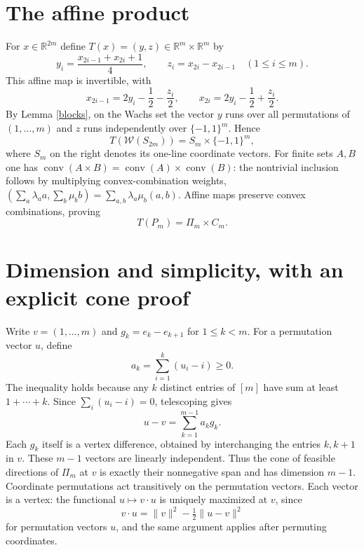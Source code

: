 \documentclass[11pt]{article}
\newcommand{\conv}{\operatorname{conv}}
\newcommand{\W}{\mathcal W}
\begin{document}
\section*{The affine product}
For $x\in\mathbb R^{2m}$ define $T(x)=(y,z)\in\mathbb R^m\times\mathbb R^m$
by
\begin{equation}\label{map}
 y_i=\frac{x_{2i-1}+x_{2i}+1}{4},\qquad
 z_i=x_{2i}-x_{2i-1}\quad(1\leq i\leq m).
\end{equation}
This affine map is invertible, with
\begin{equation}\label{inverse}
 x_{2i-1}=2y_i-\frac12-\frac{z_i}{2},\qquad
 x_{2i}=2y_i-\frac12+\frac{z_i}{2}.
\end{equation}
By Lemma \ref{blocks}, on the Wachs set the vector $y$ runs over all
permutations of $(1,\ldots,m)$ and $z$ runs independently over
$\{-1,1\}^m$. Hence
\[
 T(\W(S_{2m}))=S_m\times\{-1,1\}^m,
\]
where $S_m$ on the right denotes its one-line coordinate vectors.
For finite sets $A,B$ one has
$\conv(A\times B)=\conv(A)\times\conv(B)$: the nontrivial inclusion
follows by multiplying convex-combination weights,
$(\sum_a\lambda_a a,\sum_b\mu_b b)
=\sum_{a,b}\lambda_a\mu_b(a,b)$.
Affine maps preserve convex combinations, proving
\begin{equation}\label{product}
 T(P_m)=\Pi_m\times C_m.
\end{equation}

\section*{Dimension and simplicity, with an explicit cone proof}
Write $v=(1,\ldots,m)$ and $g_k=e_k-e_{k+1}$ for $1\leq k<m$.
For a permutation vector $u$, define
\[
 a_k=\sum_{i=1}^k(u_i-i)\geq0.
\]
The inequality holds because any $k$ distinct entries of $[m]$ have
sum at least $1+\cdots+k$. Since $\sum_i(u_i-i)=0$, telescoping gives
\begin{equation}\label{cone}
 u-v=\sum_{k=1}^{m-1}a_k g_k.
\end{equation}
Each $g_k$ itself is a vertex difference, obtained by interchanging the
entries $k,k+1$ in $v$. These $m-1$ vectors are linearly independent.
Thus the cone of feasible directions of $\Pi_m$ at $v$ is exactly their
nonnegative span and has dimension $m-1$. Coordinate permutations act
transitively on the permutation vectors. Each vector is a vertex: the
functional $u\mapsto v\cdot u$ is uniquely maximized at $v$, since
\[
 v\cdot u=\|v\|^2-\tfrac12\|u-v\|^2
\]
for permutation vectors $u$, and the same argument applies after
permuting coordinates.
\end{document}
